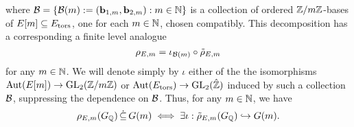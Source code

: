 where $\mathcal{B} = \{ \mathcal{B}(m) := ({\bf{b}}_{1,m}, {\bf{b}}_{2,m}) : m \in \mathbb{N} \}$ is a collection of ordered $\mathbb{Z}/m\mathbb{Z}$-bases of $E[m] \subseteq E_{\operatorname{tors}}$, one for each $m \in \mathbb{N}$, chosen compatibly.  This decomposition has a corresponding a finite level analogue 
\begin{equation}  \label{defofrhotilde}
\rho_{E,m} = \iota_{\mathcal{B}(m)} \circ \tilde{\rho}_{E,m}
\end{equation}
for any $m \in \mathbb{N}$.  We will denote simply by $\iota$ either of the the isomorphisms $\operatorname{Aut}(E[m]) \to \operatorname{GL}_2(\mathbb{Z}/m\mathbb{Z})$ or $\operatorname{Aut}(E_{\operatorname{tors}}) \to \operatorname{GL}_2(\hat{\mathbb{Z}})$ induced by such a collection $\mathcal{B}$, suppressing the dependence on $\mathcal{B}$.  Thus, for any $m \in \mathbb{N}$, we have
\[
\rho_{E,m}(G_{\mathbb{Q}}) \, \dot \subseteq \, G(m) \; \Longleftrightarrow \; \exists \iota : \tilde{\rho}_{E,m}(G_{\mathbb{Q}}) \hookrightarrow G(m).
\]

